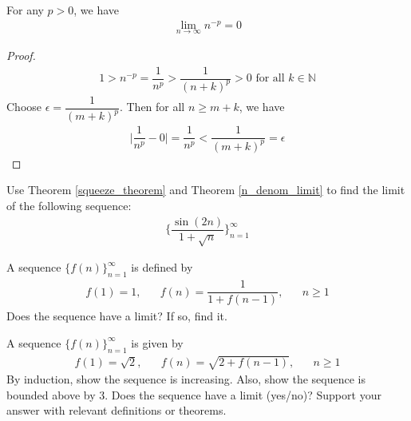 \begin{theorem}
For any $p > 0$, we have
\begin{align*}
    \lim_{n \longrightarrow \infty} n^{-p} = 0
\end{align*}
\begin{proof}
\begin{align*}
    1 > n^{-p} = \dfrac{1}{n^{p}} > \dfrac{1}{(n+k)^{p}} > 0 \hspace{4pt} \text{for all} \hspace{4pt} k \in \mathbb{N}
\end{align*}
Choose $\epsilon = \dfrac{1}{(m+k)^p}$. Then for all $n \geq m+k$, we have
\begin{align*}
    \Big\lvert \dfrac{1}{n^{p}} - 0 \Big\rvert = \dfrac{1}{n^{p}} < \dfrac{1}{(m + k)^{p}} = \epsilon
\end{align*}
\end{proof}
\label{n_denom_limit}
\end{theorem}

\begin{exercise}
Use Theorem \ref{squeeze_theorem} and Theorem \ref{n_denom_limit} to find the limit of the following sequence:
\begin{align*}
    \Big\{\dfrac{\sin(2n)}{1+\sqrt{n}}\Big\}_{n=1}^{\infty}
\end{align*}
\end{exercise}

\begin{exercise}
A sequence $\{f(n)\}_{n=1}^{\infty}$ is defined by 
\begin{align*}
    f(1) = 1, \hspace{20pt} f(n) = \dfrac{1}{1+f(n-1)}, \hspace{20pt} n \geq 1
\end{align*}
Does the sequence have a limit? If so, find it.
\end{exercise}

\begin{exercise}
A sequence $\{f(n)\}_{n=1}^{\infty}$ is given by 
\begin{align*}
    f(1) = \sqrt{2}, \hspace{20pt} f(n) = \sqrt{2 + f(n-1)}, \hspace{20pt} n \geq 1
\end{align*}
By induction, show the sequence is increasing. Also, show the sequence is bounded above by $3$. Does the sequence have a limit (yes/no)? Support your answer with relevant definitions or theorems.
\end{exercise}


